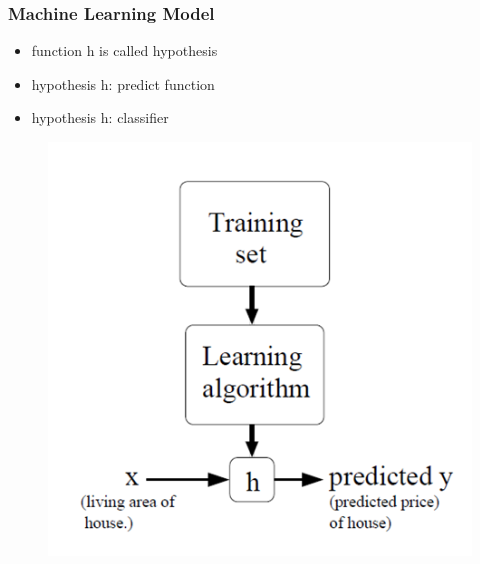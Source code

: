 \documentclass{beamer}
\begin{document}
\begin{frame}
\frametitle{Machine Learning Model}
\begin{itemize}
	\item function h is called hypothesis
	\item hypothesis h: predict function
	\item hypothesis h: classifier
\end{itemize}
\begin{figure}
\includegraphics[scale=0.4]{figs/ml_model.png}
\end{figure}
\end{frame}
\end{document}

